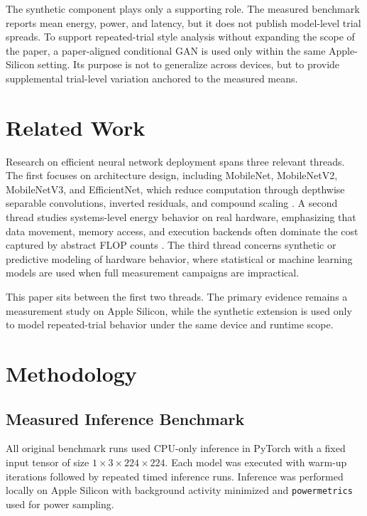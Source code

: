 \documentclass[11pt]{article}
\begin{document}
The synthetic component plays only a supporting role. The measured benchmark
reports mean energy, power, and latency, but it does not publish model-level
trial spreads. To support repeated-trial style analysis without expanding the
scope of the paper, a paper-aligned conditional GAN is used only within the
same Apple-Silicon setting. Its purpose is not to generalize across devices,
but to provide supplemental trial-level variation anchored to the measured
means.

\section{Related Work}
Research on efficient neural network deployment spans three relevant threads.
The first focuses on architecture design, including MobileNet, MobileNetV2,
MobileNetV3, and EfficientNet, which reduce computation through depthwise
separable convolutions, inverted residuals, and compound scaling
\cite{mobilenet2017,mobilenetv22018,mobilenetv32019,efficientnet2019}. A second
thread studies systems-level energy behavior on real hardware, emphasizing that
data movement, memory access, and execution backends often dominate the cost
captured by abstract FLOP counts \cite{horowitz2014,mittal2019,eyeriss2017}.
The third thread concerns synthetic or predictive modeling of hardware behavior,
where statistical or machine learning models are used when full measurement
campaigns are impractical.

This paper sits between the first two threads. The primary evidence remains a
measurement study on Apple Silicon, while the synthetic extension is used only
to model repeated-trial behavior under the same device and runtime scope.

\section{Methodology}
\subsection{Measured Inference Benchmark}
All original benchmark runs used CPU-only inference in PyTorch with a fixed
input tensor of size $1 \times 3 \times 224 \times 224$. Each model was
executed with warm-up iterations followed by repeated timed inference runs.
Inference was performed locally on Apple Silicon with background activity
minimized and \texttt{powermetrics} used for power sampling.
\end{document}
